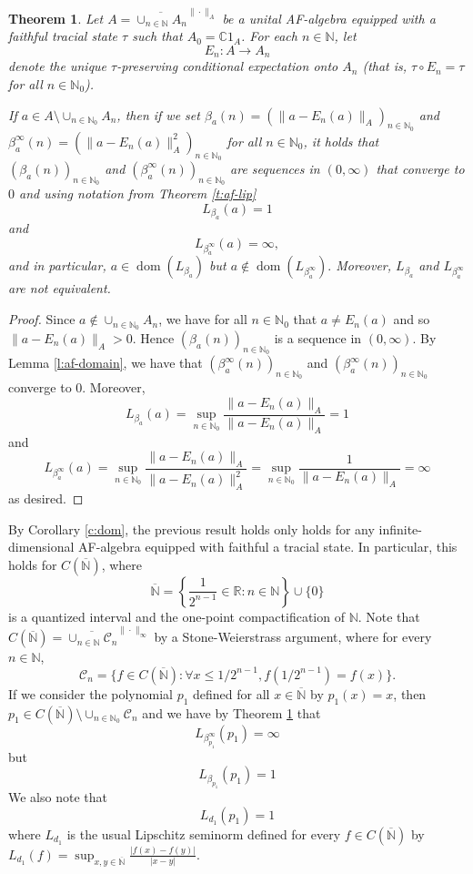 \documentclass[]{amsart}
\newcommand{\ninnz}{n \in \N_0 }
\newcommand{\overn}{\overline{\N}}
\newcommand{\N}{{\mathds{N}}}
\newcommand{\R}{{\mathds{R}}}
\newcommand{\C}{{\mathds{C}}}
\newcommand{\cc}{{\mathcal{C}}}
\newcommand{\dom}[1]{{\operatorname*{dom}\left({#1}\right)}}
\theoremstyle{plain}
\newtheorem{theorem}{Theorem}[section]
\theoremstyle{definition}
\theoremstyle{remark}
\renewcommand{\leq}{\leqslant}
\numberwithin{equation}{section}
\begin{document}
     \begin{theorem}\label{t:af-domain}
    Let $A=\overline{\cup_{n \in \N}A_n}^{\|\cdot\|_A}$ be a unital AF-algebra equipped with a faithful tracial state $\tau$ such that $A_0=\C1_A$. For each $n \in \N$, let 
\[
E_n:A \rightarrow A_n
\]
denote the unique $\tau$-preserving conditional expectation onto $A_n$ (that is, $\tau \circ E_n=\tau$ for all $\ninnz$).  

If $a \in A \setminus \cup_{\ninnz} A_n$, then if we set $\beta_a(n)=(\|a-E_n(a)\|_A)_{\ninnz}$ and $\beta^\infty_a(n)=(\|a-E_n(a)\|^2_A)_{\ninnz}$ for all $\ninnz$, it holds that $(\beta_a(n))_{\ninnz}$ and $(\beta^\infty_a(n))_{\ninnz}$ are sequences in $(0, \infty)$ that converge to $0$ and using notation from Theorem \ref{t:af-lip}
\[
L_{\beta_a}(a)=1\]
and
\[
L_{\beta^\infty_a}(a)=\infty,
\]
and in particular, $a \in \dom{L_{\beta_a}}$ but $a \not\in \dom{L_{\beta^\infty_a}}.$ Moreover, $L_{\beta_a}$ and $L_{\beta^\infty_a}$ are not equivalent.
     \end{theorem}
     \begin{proof}
     Since $a \not\in \cup_{\ninnz} A_n$, we have for all $\ninnz$ that $a\neq E_n(a)$ and so $\|a-E_n(a)\|_A>0$. Hence  $(\beta_a(n))_{\ninnz}$ is a sequence in $(0, \infty)$. By Lemma \ref{l:af-domain}, we have that $(\beta^\infty_a(n))_{\ninnz}$ and $(\beta^\infty_a(n))_{\ninnz}$   converge to $0$. Moreover,
     \[
L_{\beta_a}(a)=\sup_{\ninnz} \frac{\|a-E_n(a)\|_A}{\|a-E_n(a)\|_A}=1
     \]
     and
     \[
     L_{\beta^\infty_a}(a)=\sup_{\ninnz} \frac{\|a-E_n(a)\|_A}{\|a-E_n(a)\|^2_A}=\sup_{\ninnz} \frac{1}{\|a-E_n(a)\|_A}=\infty 
     \]
     as desired.
     \end{proof}
     By Corollary \ref{c:dom}, the previous result holds only holds for any  infinite-dimensional AF-algebra equipped with faithful a tracial state. In particular, this holds for $C(\overn)$, where 
     \[
     \overn=\left\{\frac{1}{2^{n-1}} \in \R : n \in \N\right\}\cup \{0\}
     \]
     is a quantized interval and the one-point compactification of $\N$. 
     Note that $C(\overn)=\overline{\cup_{n \in \N} \cc_n }^{\|\cdot\|_\infty}$ by a Stone-Weierstrass argument, where for every $n \in \N$,
     \begin{equation}\label{eq:cn}
     \cc_n=\{f\in C(\overn): \forall x \leq 1/2^{n-1},f(1/2^{n-1})=f(x) \}.
     \end{equation}
     If we consider the polynomial $p_1$ defined for all $x \in \overline{\N}$ by $p_1(x)=x$, then $p_1 \in C(\overn)\setminus \cup_{\ninnz} \mathcal{C}_n$ and we have by Theorem \ref{t:af-domain} that 
    \[
    L_{\beta^\infty_{p_1}}(p_1)=\infty 
    \]
    but 
\[
L_{\beta_{p_1}}(p_1)=1 
\]
  We also note that  
    \[
    L_{d_1}(p_1)= 1  
    \]
    where $L_{d_1}$ is the usual Lipschitz seminorm defined for every $f \in C(\overn)$ by $L_{d_1}(f)=\sup_{x,y\in \overn} \frac{|f(x)-f(y)|}{|x-y|}$.
    
\end{document}

